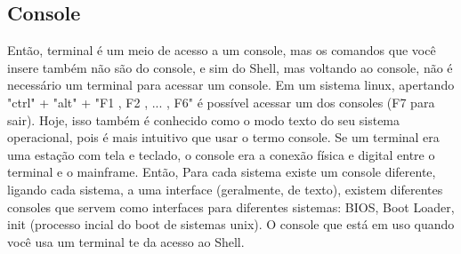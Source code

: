 \documentclass[oneside, 11 pt]{article}
\begin{document}
	\subsection{Console}
	Então, terminal é um meio de acesso a um console, mas os comandos que você insere também não são do console, e sim do Shell, mas voltando ao console, não é necessário um terminal para acessar um console. Em um sistema linux, apertando "ctrl" + "alt" + "F1 , F2 , ... , F6" é possível acessar um dos consoles (F7 para sair). Hoje, isso também é conhecido como o modo texto do seu sistema operacional, pois é mais intuitivo que usar o termo console. Se um terminal era uma estação com tela e teclado, o console era a conexão física e digital entre o terminal e o mainframe. Então, Para cada sistema existe um console diferente, ligando cada sistema, a uma interface (geralmente, de texto), existem diferentes consoles que servem como interfaces para diferentes sistemas: BIOS, Boot Loader, init (processo incial do boot de sistemas unix). O console que está em uso quando você usa um terminal te da acesso ao Shell.
\end{document}
